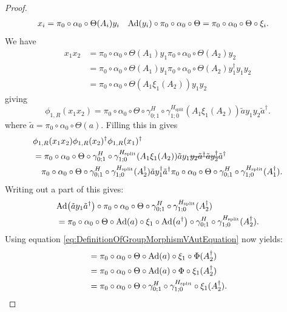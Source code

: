 \documentclass[12pt,a4paper,twoside]{article}
\numberwithin{equation}{section}
\begin{document}
\begin{proof}
	\begin{align}
		x_i&=\pi_0\circ\alpha_0\circ\Theta(A_i)y_i&\Ad{y_i}\circ\pi_0\circ\alpha_0\circ\Theta&=\pi_0\circ\alpha_0\circ\Theta\circ\xi_i.
	\end{align}
	We have
	\begin{align}
		x_1x_2&=\pi_0\circ\alpha_0\circ\Theta(A_1)y_1\pi_0\circ\alpha_0\circ\Theta(A_2)y_2\\
		&=\pi_0\circ\alpha_0\circ\Theta(A_1)y_1\pi_0\circ\alpha_0\circ\Theta(A_2)y_1^{\dagger}y_1y_2\\
		&=\pi_0\circ\alpha_0\circ\Theta(A_1\xi_1(A_2))y_1y_2
	\end{align}
	giving
	\begin{equation}
		\phi_{1,R}(x_1x_2)=\pi_0\circ\alpha_0\circ\Theta\circ\gamma^H_{0;1}\circ\gamma^{H_\text{split}}_{1;0}(A_1\xi_1(A_2))\tilde{a}y_1y_2\tilde{a}^\dagger.
	\end{equation}
	where $\tilde{a}=\pi_0\circ\alpha_0\circ\Theta(a)$. Filling this in gives
	\begin{align}
		&\phi_{1,R}(x_1x_2)\phi_{1,R}(x_2)^\dagger\phi_{1,R}(x_1)^\dagger\\
		\label{eq:HomomorphismCondition}
		&=\pi_0\circ\alpha_0\circ\Theta\circ\gamma^H_{0;1}\circ\gamma^{H_\text{split}}_{1;0}(A_1\xi_1(A_2))\tilde{a}y_1\stkout{y_2\tilde{a}^\dagger \tilde{a}y_2^\dagger}\tilde{a}^\dagger\\
		\nonumber
		&\quad\pi_0\circ\alpha_0\circ\Theta\circ\gamma^H_{0;1}\circ\gamma^{H_\text{split}}_{1;0}(A_2^\dagger)\tilde{a}y_1^\dagger\tilde{a}^\dagger \pi_0\circ\alpha_0\circ\Theta\circ\gamma^H_{0;1}\circ\gamma^{H_\text{split}}_{1;0}(A_1^\dagger).
	\end{align}
	Writing out a part of this gives:
	\begin{align}
		&\Ad{\tilde{a}y_1\tilde{a}^\dagger}\circ\pi_0\circ\alpha_0\circ\Theta\circ\gamma^H_{0;1}\circ\gamma^{H_\text{split}}_{1;0}(A_2^\dagger)\\
		&=\pi_0\circ\alpha_0\circ\Theta\circ\Ad{a}\circ\xi_1\circ\Ad{a^\dagger}\circ\gamma^H_{0;1}\circ\gamma^{H_\text{split}}_{1;0}(A_2^\dagger).
	\end{align}
	Using equation \eqref{eq:DefinitionOfGroupMorphismVAutEquation} now yields:
	\begin{align}
		&=\pi_0\circ\alpha_0\circ\Theta\circ\Ad{a}\circ\xi_1\circ\Phi(A_2^\dagger)\\
		&=\pi_0\circ\alpha_0\circ\Theta\circ\Ad{a}\circ\Phi\circ\xi_1(A_2^\dagger)\\
		&=\pi_0\circ\alpha_0\circ\Theta\circ\gamma^H_{0;1}\circ\gamma^{H_\text{split}}_{1;0}\circ\xi_1(A_2^\dagger).

\end{align}
\end{proof}
\end{document}
